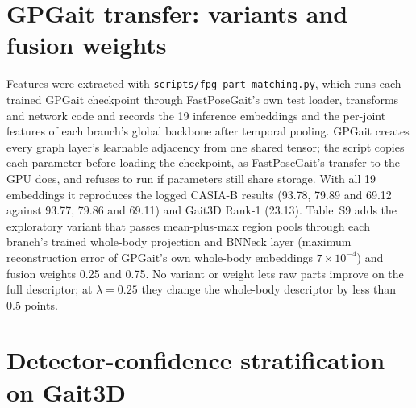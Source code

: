 \documentclass[11pt]{article}
\newcommand{\tablesetup}{\small\setlength{\tabcolsep}{4pt}}
\begin{document}
\section{GPGait transfer: variants and fusion weights}
\label{sec:s-gpgait}

Features were extracted with \texttt{scripts/fpg\_part\_matching.py}, which
runs each trained GPGait checkpoint through FastPoseGait's own test loader,
transforms and network code and records the 19 inference embeddings and the
per-joint features of each branch's global backbone after temporal pooling.
GPGait creates every graph layer's learnable adjacency from one shared tensor;
the script copies each parameter before loading the checkpoint, as
FastPoseGait's transfer to the GPU does, and refuses to run if parameters still
share storage. With all 19 embeddings it reproduces the logged CASIA-B results
(93.78, 79.89 and 69.12 against 93.77, 79.86 and 69.11) and Gait3D Rank-1
(23.13). Table~S9 adds the exploratory variant that passes mean-plus-max region
pools through each branch's trained whole-body projection and BNNeck layer
(maximum reconstruction error of GPGait's own whole-body embeddings
$7\times10^{-4}$) and fusion weights 0.25 and 0.75. No variant or weight lets
raw parts improve on the full descriptor; at $\lambda=0.25$ they change the
whole-body descriptor by less than 0.5 points.

\begin{table}[!htbp]
\centering
\caption{GPGait with raw parts: declared and exploratory variants and other
fusion weights (Rank-1 and mAP, \%). Without raw parts, the full descriptor
reaches 80.93 (CASIA-B average) and 23.13 / 16.79 (Gait3D Rank-1 / mAP), and the
whole-body descriptor 71.85 and 17.95 / 12.59.}
\label{tab:s-gpgait}
{\tablesetup\footnotesize
}
\end{table}

\section{Detector-confidence stratification on Gait3D}
\label{sec:s-confidence}
\end{document}
